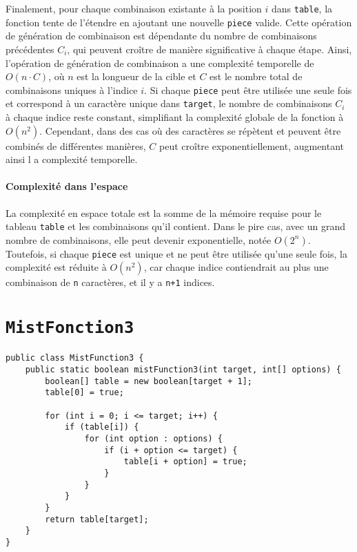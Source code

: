 \documentclass[10pt]{report}
\begin{document}
  Finalement, pour chaque combinaison existante à la position $i$ dans \texttt{table}, 
  la fonction tente de l'étendre en ajoutant une nouvelle \texttt{piece} valide. 
  Cette opération de génération de combinaison est dépendante du nombre de
  combinaisons précédentes $C_i$, qui peuvent croître de manière significative 
  à chaque étape. Ainsi, l'opération de génération de combinaison a une 
  complexité temporelle de $O(n \cdot C)$, où $n$ est la longueur de la 
  cible et $C$ est le nombre total de combinaisons uniques à l'indice $i$. 
  Si chaque \texttt{piece} peut être utilisée une seule fois et correspond 
  à un caractère unique dans \texttt{target}, le nombre de combinaisons $C_i$ 
  à chaque indice reste constant, simplifiant la complexité globale de la fonction à $O(n^2)$.
  Cependant, dans des cas où des caractères se répètent et peuvent être combinés de
  différentes manières, $C$ peut croître exponentiellement, augmentant ainsi l
  a complexité temporelle.


  \paragraph{Complexité dans l'espace}
  La complexité en espace totale est la somme de la mémoire requise pour le tableau 
  \texttt{table} et les combinaisons qu'il contient. Dans le pire cas, avec un grand nombre de 
  combinaisons, elle peut devenir exponentielle, notée \( O(2^n) \). Toutefois, si chaque 
  \texttt{piece} est unique et ne peut être utilisée qu'une seule fois, la complexité est 
  réduite à \( O(n^2) \), car chaque indice contiendrait au plus une combinaison de \texttt{n} 
  caractères, et il y a \texttt{n+1} indices.

  \section{\texttt{MistFonction3}}
  \begin{lstlisting}[style=JavaDraculaWhite]
 public class MistFunction3 {
    public static boolean mistFunction3(int target, int[] options) {
        boolean[] table = new boolean[target + 1];
        table[0] = true;

        for (int i = 0; i <= target; i++) {
            if (table[i]) {
                for (int option : options) {
                    if (i + option <= target) {
                        table[i + option] = true;
                    }
                }
            }
        }
        return table[target];
    }
}    
  \end{lstlisting}
\end{document}
